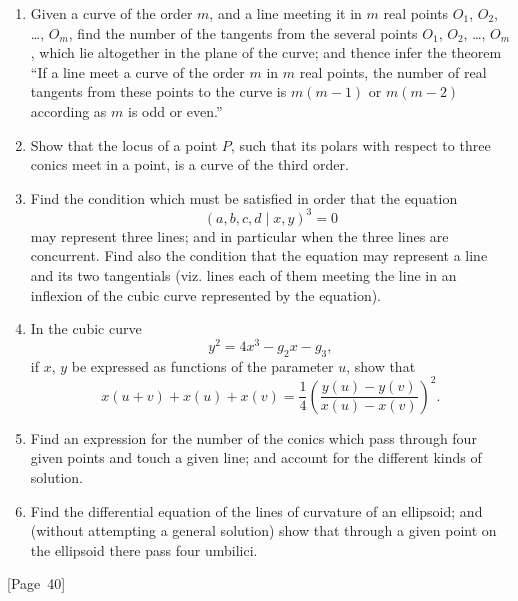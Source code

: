 \documentclass[11pt,a4paper]{article}
\theoremstyle{plain}
\theoremstyle{definition}
\theoremstyle{remark}
\begin{document}
\begin{enumerate}
\item Given a curve of the order $m$, and a line meeting it in $m$ real
points $O_1$, $O_2$, \dots, $O_m$, find the number of the tangents from
the several points $O_1$, $O_2$, \dots, $O_m$, which lie altogether in the
plane of the curve; and thence infer the theorem ``If a line meet a
curve of the order $m$ in $m$ real points, the number of real tangents
from these points to the curve is $m(m-1)$ or $m(m-2)$ according as $m$
is odd or even.''

\item Show that the locus of a point $P$, such that its polars with
respect to three conics meet in a point, is a curve of the third order.

\item Find the condition which must be satisfied in order that the equation
\[
(a,b,c,d\mid x,y)^3 = 0
\]
may represent three lines; and in particular when the three lines are
concurrent. Find also the condition that the equation may represent a
line and its two tangentials (viz. lines each of them meeting the line
in an inflexion of the cubic curve represented by the equation).

\item In the cubic curve
\[
y^2 = 4x^3 - g_2x - g_3,
\]
if $x$, $y$ be expressed as functions of the parameter $u$, show that
\[
x(u+v) + x(u) + x(v) = \frac{1}{4}\left(
\frac{y(u) - y(v)}{x(u) - x(v)} \right)^2.
\]

\item Find an expression for the number of the conics which pass through
four given points and touch a given line; and account for the different
kinds of solution.

\item Find the differential equation of the lines of curvature of an
ellipsoid; and (without attempting a general solution) show that through
a given point on the ellipsoid there pass four umbilici.
\end{enumerate}

\begin{center}
[Page~40]
\end{center}
\end{document}
